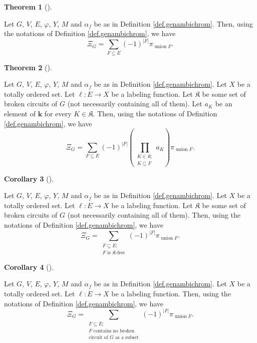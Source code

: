 \documentclass[numbers=enddot,12pt,final,onecolumn,notitlepage]{scrartcl}%
\theoremstyle{definition}
\newtheorem{theo}{Theorem}[section]
\newenvironment{theorem}[1][]
{\begin{theo}[#1]\begin{leftbar}}
{\end{leftbar}\end{theo}}
\newtheorem{coro}[theo]{Corollary}
\newenvironment{corollary}[1][]
{\begin{coro}[#1]\begin{leftbar}}
{\end{leftbar}\end{coro}}
\let\sumnonlimits\sum
\let\prodnonlimits\prod
\renewcommand{\sum}{\sumnonlimits\limits}
\renewcommand{\prod}{\prodnonlimits\limits}
\begin{document}
\begin{theorem}
\label{thm.genambichromsym.empty}Let $G$, $V$, $E$, $\varphi$, $Y$, $M$ and
$\alpha_{f}$ be as in Definition \ref{def.genambichrom}. Then, using the
notations of Definition \ref{def.genambichrom}, we have%
\[
\Xi_{G}=\sum_{F\subseteq E}\left(  -1\right)  ^{\left\vert F\right\vert }%
\pi_{\operatorname*{union}F}.
\]

\end{theorem}


\begin{theorem}
\label{thm.genambichromsym.varis}Let $G$, $V$, $E$, $\varphi$, $Y$, $M$ and
$\alpha_{f}$ be as in Definition \ref{def.genambichrom}. Let $X$ be a totally
ordered set. Let $\ell:E\rightarrow X$ be a labeling function. Let
$\mathfrak{K}$ be some set of broken circuits of $G$ (not necessarily
containing all of them). Let $a_{K}$ be an element of $\mathbf{k}$ for every
$K\in\mathfrak{K}$. Then, using the notations of Definition
\ref{def.genambichrom}, we have%
\[
\Xi_{G}=\sum_{F\subseteq E}\left(  -1\right)  ^{\left\vert F\right\vert
}\left(  \prod_{\substack{K\in\mathfrak{K};\\K\subseteq F}}a_{K}\right)
\pi_{\operatorname*{union}F}.
\]

\end{theorem}


\begin{corollary}
\label{cor.genambichromsym.K-free}Let $G$, $V$, $E$, $\varphi$, $Y$, $M$ and
$\alpha_{f}$ be as in Definition \ref{def.genambichrom}. Let $X$ be a totally
ordered set. Let $\ell:E\rightarrow X$ be a labeling function. Let
$\mathfrak{K}$ be some set of broken circuits of $G$ (not necessarily
containing all of them). Then, using the notations of Definition
\ref{def.genambichrom}, we have%
\[
\Xi_{G}=\sum_{\substack{F\subseteq E;\\F\text{ is }\mathfrak{K}\text{-free}%
}}\left(  -1\right)  ^{\left\vert F\right\vert }\pi_{\operatorname*{union}F}.
\]

\end{corollary}

\begin{corollary}
\label{cor.genambichromsym.NBC}Let $G$, $V$, $E$, $\varphi$, $Y$, $M$ and
$\alpha_{f}$ be as in Definition \ref{def.genambichrom}. Let $X$ be a totally
ordered set. Let $\ell:E\rightarrow X$ be a labeling function. Then, using the
notations of Definition \ref{def.genambichrom}, we have%
\[
\Xi_{G}=\sum_{\substack{F\subseteq E;\\F\text{ contains no broken}%
\\\text{circuit of }G\text{ as a subset}}}\left(  -1\right)  ^{\left\vert
F\right\vert }\pi_{\operatorname*{union}F}.
\]

\end{corollary}
\end{document}
